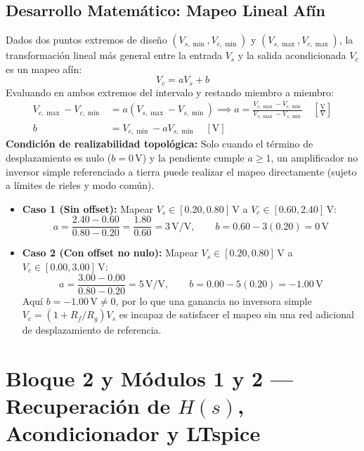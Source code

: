 \documentclass[11pt, a4paper]{article}
\begin{document}
\subsection{Desarrollo Matemático: Mapeo Lineal Afín}
Dados dos puntos extremos de diseño $(V_{s,\min}, V_{c,\min})$ y $(V_{s,\max}, V_{c,\max})$, la transformación lineal más general entre la entrada $V_s$ y la salida acondicionada $V_c$ es un mapeo afín:
\begin{equation}
    V_c = a V_s + b
\end{equation}
Evaluando en ambos extremos del intervalo y restando miembro a miembro:
\begin{align}
    V_{c,\max} - V_{c,\min} &= a(V_{s,\max} - V_{s,\min}) \implies a = \frac{V_{c,\max} - V_{c,\min}}{V_{s,\max} - V_{s,\min}} \quad \left[\frac{\text{V}}{\text{V}}\right] \\
    b &= V_{c,\min} - a V_{s,\min} \quad [\text{V}]
\end{align}
\textbf{Condición de realizabilidad topológica:} Solo cuando el término de desplazamiento es nulo ($b = 0\,\text{V}$) y la pendiente cumple $a \ge 1$, un amplificador no inversor simple referenciado a tierra puede realizar el mapeo directamente (sujeto a límites de rieles y modo común).
\begin{itemize}[noitemsep]
    \item \textbf{Caso 1 (Sin offset):} Mapear $V_s \in [0.20, 0.80]\,\text{V}$ a $V_c \in [0.60, 2.40]\,\text{V}$:
    \[
        a = \frac{2.40 - 0.60}{0.80 - 0.20} = \frac{1.80}{0.60} = 3\,\text{V/V}, \qquad b = 0.60 - 3(0.20) = 0\,\text{V}
    \]
    \item \textbf{Caso 2 (Con offset no nulo):} Mapear $V_s \in [0.20, 0.80]\,\text{V}$ a $V_c \in [0.00, 3.00]\,\text{V}$:
    \[
        a = \frac{3.00 - 0.00}{0.80 - 0.20} = 5\,\text{V/V}, \qquad b = 0.00 - 5(0.20) = -1.00\,\text{V}
    \]
    Aquí $b = -1.00\,\text{V} \neq 0$, por lo que una ganancia no inversora simple $V_c = (1+R_f/R_g)V_s$ es incapaz de satisfacer el mapeo sin una red adicional de desplazamiento de referencia.
\end{itemize}

\newpage
\section{Bloque 2 y Módulos 1 y 2 — Recuperación de $H(s)$, Acondicionador y LTspice}
\end{document}
